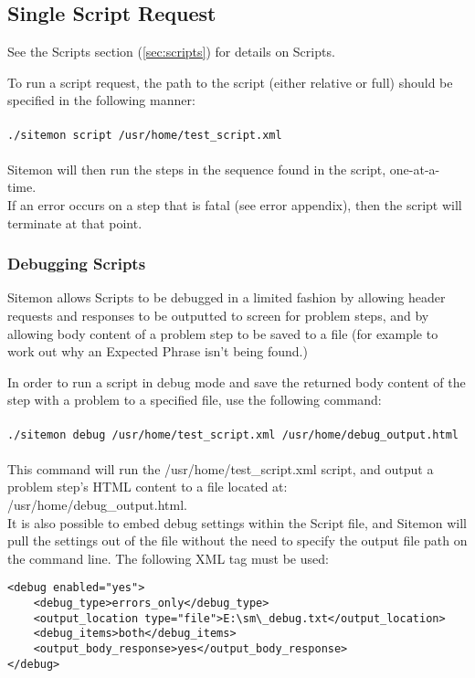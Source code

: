 \documentclass[a4paper]{article}
\begin{document}
\subsection{Single Script Request} \label{sec:single_script_request}

See the Scripts section (\ref{sec:scripts}) for details on Scripts.

To run a script request, the path to the script (either relative or full) should be specified in the following manner:\\\\
{\tt ./sitemon script /usr/home/test\_script.xml}\\\\
 Sitemon will then run the steps in the sequence found in the script, one-at-a-time.\\
If an error occurs on a step that is fatal (see error appendix), then the script will terminate at that point.

\pagebreak

\subsubsection{Debugging Scripts}

Sitemon allows Scripts to be debugged in a limited fashion by allowing header requests and responses to be outputted to screen for problem
steps, and by allowing body content of a problem step to be saved to a file (for example to work out why an Expected Phrase isn't being
found.)

In order to run a script in debug mode and save the returned body content of the step with a problem to a specified file, use the following command:\\\\
{\tt ./sitemon debug /usr/home/test\_script.xml /usr/home/debug\_output.html}\\\\
This command will run the /usr/home/test\_script.xml script, and output a problem step's HTML content to a file located at:
 /usr/home/debug\_output.html.
\\
It is also possible to embed debug settings within the Script file, and Sitemon will pull the settings out of the file without
 the need to specify the output file path on the command line. The following XML tag must be used:
\begin{verbatim}
<debug enabled="yes">
	<debug_type>errors_only</debug_type>
	<output_location type="file">E:\sm\_debug.txt</output_location>
	<debug_items>both</debug_items>
	<output_body_response>yes</output_body_response>
</debug>
\end{verbatim}
\end{document}
